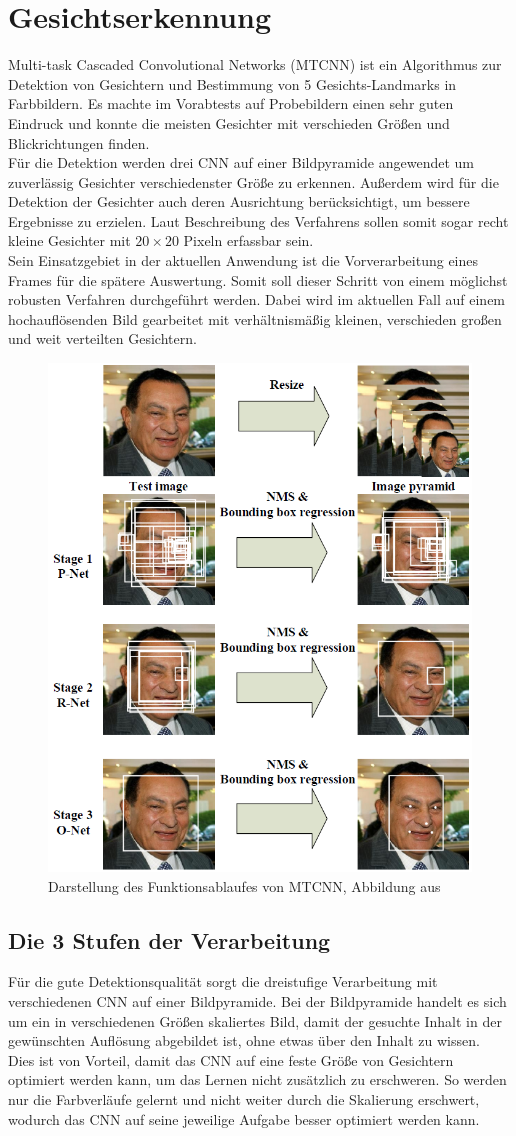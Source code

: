 \section{Gesichtserkennung}
\label{MTCNN}
Multi-task Cascaded Convolutional Networks (MTCNN) ist ein Algorithmus zur Detektion von Gesichtern und Bestimmung von 5 Gesichts-Landmarks in Farbbildern. Es machte im Vorabtests auf Probebildern einen sehr guten Eindruck und konnte die meisten Gesichter mit verschieden Größen und Blickrichtungen finden.\\
Für die Detektion werden drei CNN auf einer Bildpyramide angewendet um zuverlässig Gesichter verschiedenster Größe zu erkennen. Außerdem wird für die Detektion der Gesichter auch deren Ausrichtung berücksichtigt, um bessere Ergebnisse zu erzielen. Laut Beschreibung des Verfahrens sollen somit sogar recht kleine Gesichter mit $20\times 20$ Pixeln erfassbar sein.\\
Sein Einsatzgebiet in der aktuellen Anwendung ist die Vorverarbeitung eines Frames für die spätere Auswertung. Somit soll dieser Schritt von einem möglichst robusten Verfahren durchgeführt werden. Dabei wird im aktuellen Fall auf einem hochauflösenden Bild gearbeitet mit verhältnismäßig kleinen, verschieden großen und weit verteilten Gesichtern.
\begin{figure}
	\centering
	\includegraphics[width=0.5\linewidth]{img/MTCNN_Step}
	\caption{Darstellung des Funktionsablaufes von MTCNN, Abbildung aus \cite{MTCCN}}
	\label{img_MTCNN_Step}
\end{figure}
\subsection{Die 3 Stufen der Verarbeitung}
Für die gute Detektionsqualität sorgt die dreistufige Verarbeitung mit verschiedenen CNN auf einer Bildpyramide. Bei der Bildpyramide handelt es sich um ein in verschiedenen Größen skaliertes Bild, damit der gesuchte Inhalt in der gewünschten Auflösung abgebildet ist, ohne etwas über den Inhalt zu wissen.\\
Dies ist von Vorteil, damit das CNN auf eine feste Größe von Gesichtern optimiert werden kann, um das Lernen nicht zusätzlich zu erschweren. So werden nur die Farbverläufe gelernt und nicht weiter durch die Skalierung erschwert, wodurch das CNN auf seine jeweilige Aufgabe besser optimiert werden kann.
